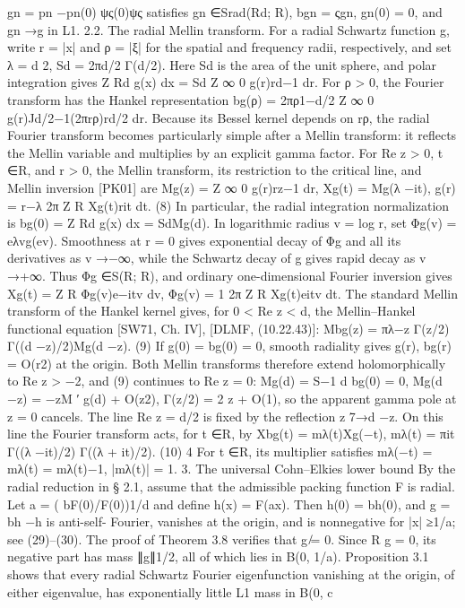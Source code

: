 gn = pn −pn(0)
ψς(0)ψς
satisﬁes gn ∈Srad(Rd; R), bgn = ςgn, gn(0) = 0, and gn →g in L1.
2.2. The radial Mellin transform. For a radial Schwartz function g, write r = |x| and ρ = |ξ|
for the spatial and frequency radii, respectively, and set
λ = d
2,
Sd = 2πd/2
Γ(d/2).
Here Sd is the area of the unit sphere, and polar integration gives
Z
Rd g(x) dx = Sd
Z ∞
0
g(r)rd−1 dr.
For ρ > 0, the Fourier transform has the Hankel representation
bg(ρ) = 2πρ1−d/2
Z ∞
0
g(r)Jd/2−1(2πrρ)rd/2 dr.
Because its Bessel kernel depends on rρ, the radial Fourier transform becomes particularly
simple after a Mellin transform: it reﬂects the Mellin variable and multiplies by an explicit
gamma factor. For Re z > 0, t ∈R, and r > 0, the Mellin transform, its restriction to the
critical line, and Mellin inversion [PK01] are
Mg(z) =
Z ∞
0
g(r)rz−1 dr,
Xg(t) = Mg(λ −it),
g(r) = r−λ
2π
Z
R
Xg(t)rit dt.
(8)
In particular, the radial integration normalization is
bg(0) =
Z
Rd g(x) dx = SdMg(d).
In logarithmic radius v = log r, set Φg(v) = eλvg(ev). Smoothness at r = 0 gives exponential
decay of Φg and all its derivatives as v →−∞, while the Schwartz decay of g gives rapid decay
as v →+∞. Thus Φg ∈S(R; R), and ordinary one-dimensional Fourier inversion gives
Xg(t) =
Z
R
Φg(v)e−itv dv,
Φg(v) = 1
2π
Z
R
Xg(t)eitv dt.
The standard Mellin transform of the Hankel kernel gives, for 0 < Re z < d, the Mellin–Hankel
functional equation [SW71, Ch. IV], [DLMF, (10.22.43)]:
Mbg(z) = πλ−z
Γ(z/2)
Γ((d −z)/2)Mg(d −z).
(9)
If g(0) = bg(0) = 0, smooth radiality gives g(r), bg(r) = O(r2) at the origin.
Both Mellin
transforms therefore extend holomorphically to Re z > −2, and (9) continues to Re z = 0:
Mg(d) = S−1
d bg(0) = 0,
Mg(d −z) = −zM ′
g(d) + O(z2),
Γ(z/2) = 2
z + O(1),
so the apparent gamma pole at z = 0 cancels. The line Re z = d/2 is ﬁxed by the reﬂection
z 7→d −z. On this line the Fourier transform acts, for t ∈R, by
Xbg(t) = mλ(t)Xg(−t),
mλ(t) = πit Γ((λ −it)/2)
Γ((λ + it)/2).
(10)
4
For t ∈R, its multiplier satisﬁes
mλ(−t) = mλ(t) = mλ(t)−1,
|mλ(t)| = 1.
3. The universal Cohn–Elkies lower bound
By the radial reduction in § 2.1, assume that the admissible packing function F is radial. Let
a = ( bF(0)/F(0))1/d and deﬁne h(x) = F(ax). Then h(0) = bh(0), and g = bh −h is anti-self-
Fourier, vanishes at the origin, and is nonnegative for |x| ≥1/a; see (29)–(30). The proof of
Theorem 3.8 veriﬁes that g ̸= 0. Since
R g = 0, its negative part has mass ∥g∥1/2, all of which
lies in B(0, 1/a).
Proposition 3.1 shows that every radial Schwartz Fourier eigenfunction vanishing at the origin,
of either eigenvalue, has exponentially little L1 mass in B(0, c
